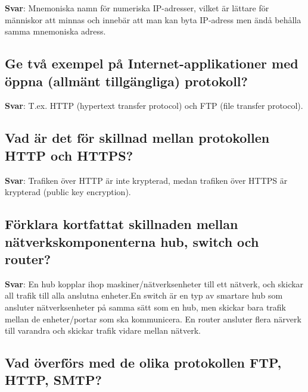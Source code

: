 \documentclass[a4paper,11pt,oneside]{article}
\begin{document}
\begin{sloppypar}
\label{q:150:sa:sv:True}

\textbf{Svar}: Mnemoniska namn f\"or numeriska IP-adresser, vilket \"ar l\"attare f\"or m\"anniskor att minnas och inneb\"ar att man kan byta IP-adress men \"and\r{a} beh\r{a}lla samma mnemoniska adress.



\subsection{Ge tv\r{a} exempel p\r{a} Internet-applikationer med \"oppna (allm\"ant tillg\"angliga) protokoll?}

\label{q:151:sa:sv:True}

\textbf{Svar}: T.ex. HTTP (hypertext transfer protocol) och FTP (file transfer protocol).



\subsection{Vad \"ar det f\"or skillnad mellan protokollen HTTP och HTTPS?}

\label{q:152:sa:sv:True}

\textbf{Svar}: Trafiken \"over HTTP \"ar inte krypterad, medan trafiken \"over HTTPS \"ar krypterad (public key encryption).



\subsection{F\"orklara kortfattat skillnaden mellan n\"atverkskomponenterna hub, switch och router?}

\label{q:153:sa:sv:True}

\textbf{Svar}: En hub kopplar ihop maskiner/n\"atverksenheter till ett n\"atverk, och skickar all trafik till alla anslutna enheter.En switch \"ar en typ av smartare hub som ansluter n\"atverksenheter p\r{a} samma s\"att som en hub, men skickar bara trafik mellan de enheter/portar som ska kommunicera. En router ansluter flera n\"arverk till varandra och skickar trafik vidare mellan n\"atverk.



\subsection{Vad \"overf\"ors med de olika protokollen FTP, HTTP, SMTP?}

\label{q:154:sa:sv:True}


\end{sloppypar}
\end{document}

